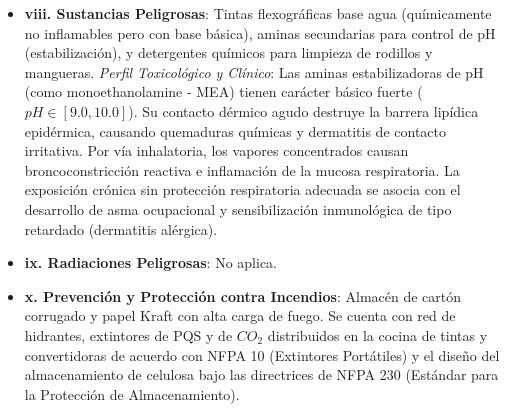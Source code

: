 \documentclass[11pt, letterpaper]{article}
\begin{document}
\begin{itemize}
    \item \textbf{viii. Sustancias Peligrosas}: Tintas flexográficas base agua (químicamente no inflamables pero con base básica), aminas secundarias para control de pH (estabilización), y detergentes químicos para limpieza de rodillos y mangueras. \textit{Perfil Toxicológico y Clínico}: Las aminas estabilizadoras de pH (como monoethanolamine - MEA) tienen carácter básico fuerte ($pH \in [9.0, 10.0]$). Su contacto dérmico agudo destruye la barrera lipídica epidérmica, causando quemaduras químicas y dermatitis de contacto irritativa. Por vía inhalatoria, los vapores concentrados causan broncoconstricción reactiva e inflamación de la mucosa respiratoria. La exposición crónica sin protección respiratoria adecuada se asocia con el desarrollo de asma ocupacional y sensibilización inmunológica de tipo retardado (dermatitis alérgica).
    \item \textbf{ix. Radiaciones Peligrosas}: No aplica.
    \item \textbf{x. Prevención y Protección contra Incendios}: Almacén de cartón corrugado y papel Kraft con alta carga de fuego. Se cuenta con red de hidrantes, extintores de PQS y de $CO_2$ distribuidos en la cocina de tintas y convertidoras de acuerdo con NFPA 10 (Extintores Portátiles) y el diseño del almacenamiento de celulosa bajo las directrices de NFPA 230 (Estándar para la Protección de Almacenamiento).
\end{itemize}
\end{document}

